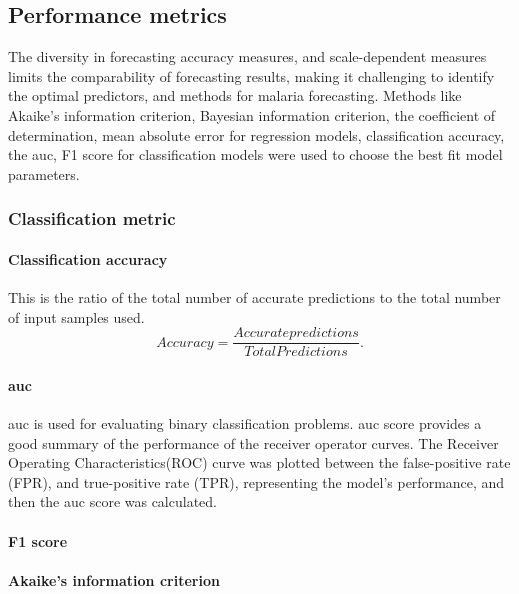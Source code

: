 \documentclass[a4paper, 12pt, twoside]{article}
\begin{document}
\subsection{Performance metrics}%
\label{par:performance_metrics}
The diversity in forecasting accuracy measures, and scale-dependent measures limits the comparability of forecasting results, making it challenging to identify the optimal predictors, and methods for malaria forecasting.
Methods like Akaike’s information criterion, Bayesian information criterion, the coefficient of determination, mean absolute error for regression models, classification accuracy, the \gls{auc}, F1 score for classification models were used to choose the best fit model parameters.
\subsubsection{Classification metric}
\paragraph{Classification accuracy}%
\label{par:classification_accuracy}
This is the ratio of the total number of accurate predictions to the total number of input samples used.
\[
	Accuracy = \frac{Accurate predictions}{Total Predictions}
	.\]

\paragraph{\gls{auc}}%
\label{par:auc}
\gls{auc} is used for evaluating binary classification problems.
\gls{auc} score provides a good summary of the performance of the receiver operator curves.
The Receiver Operating Characteristics(ROC) curve was plotted between the false-positive rate (FPR), and true-positive rate (TPR), representing the model’s performance, and then the \gls{auc} score was calculated.

\paragraph{F1 score}%
\label{par:f1_score}

\paragraph{Akaike's information criterion}%
\label{par:akaike_s_information_criterion}
\end{document}
